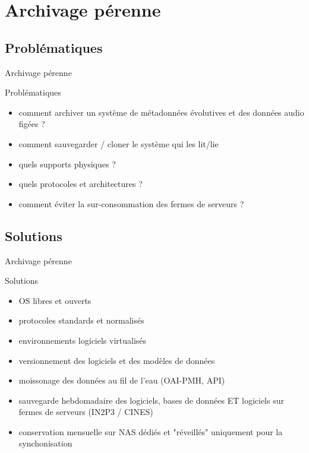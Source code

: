 \documentclass[final, hyperref, table]{beamer}
\begin{document}
\section[Archivage pérenne]{Archivage pérenne}

\subsection{Problématiques}
\begin{frame}{Archivage pérenne}

  \begin{block}{Problématiques}%
    \begin{itemize}
    \item comment archiver un système de métadonnées évolutives et des données audio figées ?
    \item comment sauvegarder / cloner le système qui les lit/lie
    \item quels supports physiques ?
    \item quels protocoles et architectures ?
    \item comment éviter la sur-consommation des fermes de serveurs ?
    \end{itemize}
  \end{block}

\end{frame}

\subsection{Solutions}
\begin{frame}{Archivage pérenne}
  \begin{block}{Solutions}%
    \begin{itemize}
    \item OS libres et ouverts
    \item protocoles standards et normalisés
    \item environnements logiciels virtualisés
    \item versionnement des logiciels et des modèles de données
    \item moissonage des données au fil de l'eau (OAI-PMH, API)
    \item sauvegarde hebdomadaire des logiciels, bases de données ET logiciels sur fermes de serveurs (IN2P3 / CINES)
    \item conservation mensuelle sur NAS dédiés et "réveillés" uniquement pour la synchonisation
    \end{itemize}
  \end{block}

\end{frame}
\end{document}
